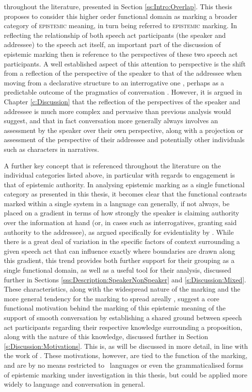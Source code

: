 throughout the literature, presented in Section \ref{ss:Intro:Overlap}. This thesis proposes to consider this higher order functional domain as marking a broader category of \textsc{epistemic} meaning, in turn being referred to \textsc{epistemic} marking. In reflecting the relationship of both speech act participants (the speaker and addressee) to the speech act itself, an important part of the discussion of epistemic marking then is reference to the perspectives of these two speech act participants. A well established aspect of this attention to perspective is the shift from a reflection of the perspective of the speaker to that of the addressee when moving from a declarative structure to an interrogative one \cites[242]{Aikhenvald2004}{EgoIntro}, perhaps as a predictable outcome of the pragmatics of conversation \cite{Hill2020}. However, it is argued in Chapter \ref{c:Discussion} that the reflection of the perspectives of the speaker and addressee is much more complex and pervasive than previous analysis would suggest, and that in fact conversation more generally always involves an assessment by the speaker over their own perspective, along with a projection or assessment of the perspective of their addressee and potentially other individuals such as characters in narratives. 

A further key concept that is referenced throughout the literature on the individual categories listed above, in particular with regards to engagement \cite{EvansBergqvistSanRoque2018a} is that of epistemic authority. In analysing epistemic marking as a single functional category as presented in this thesis, it becomes clear that the functional contrasts marked within a single system in a language can generally, if not always, be placed on a gradient in terms of how strongly the speaker is claiming authority over the information at hand (or, in cases such as interrogatives, granting said authority to the addressee), as argued specifically for evidentiality by . While there is a great deal of variation in the specific factors of context surrounding a given speech act that can influence exactly where boundaries are drawn along this gradient, this trend provides both further support for their grouping as a single functional domain, as well as a useful tool for their analysis, discussed further in Sections \ref{sss:Description:SpeakerNonSpeaker} and \ref{s:Discussion:Mixed}. These characteristics, along with the widespread nature of the marking and the more general tendency for the marking to spread areally \cite{Aikhenvald2004}, suggest a core functional motivation behind the marking of this epistemic meaning of the support of smooth conversation by establishing a shared ground between speech act participants regarding their respective knowledge surrounding a proposition, along with the nature of this knowledge, discussed further in Section \ref{s:Discussion:Motivations}. This is, as will be discussed in more detail, in line with the work of . These motivations, however, are tied to the function of the marking, and are by no means restricted to \lfam\ languages or even the grammaticalised forms of epistemic marking under investigation in this thesis, but could be applied more widely to language and conversation in general.

